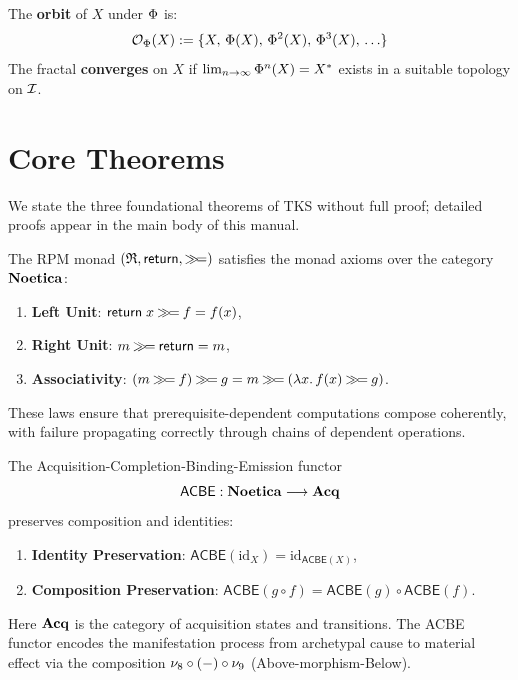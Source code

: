 \begin{definition}
\label{def:fractal-orbit}
The \textbf{orbit} of $X$ under $\Phi$ is:
\[
    \mathcal{O}_\Phi(X) := \{X,\, \Phi(X),\, \Phi^2(X),\, \Phi^3(X),\, \ldots\}
\]
The fractal \textbf{converges} on $X$ if $\lim_{n \to \infty} \Phi^n(X) = X^*$ exists
in a suitable topology on $\mathcal{I}$.
\end{definition}

\section{Core Theorems}
\label{sec:core-theorems}

We state the three foundational theorems of TKS without full proof; detailed proofs
appear in the main body of this manual.

\begin{theorem}
\label{thm:core-rpm}
The RPM monad $(\mathfrak{R}, \mathsf{return}, \mathbin{\gg\!=})$ satisfies the monad axioms over the category
$\mathbf{Noetica}$:
\begin{enumerate}[label=(\alph*)]
    \item \textbf{Left Unit}: $\mathsf{return}\; x \mathbin{\gg\!=} f = f(x)$,
    \item \textbf{Right Unit}: $m \mathbin{\gg\!=} \mathsf{return} = m$,
    \item \textbf{Associativity}: $(m \mathbin{\gg\!=} f) \mathbin{\gg\!=} g = m \mathbin{\gg\!=} (\lambda x.\, f(x) \mathbin{\gg\!=} g)$.
\end{enumerate}
These laws ensure that prerequisite-dependent computations compose coherently, with
failure propagating correctly through chains of dependent operations.
\end{theorem}

\begin{theorem}
\label{thm:core-acbe}
The Acquisition-Completion-Binding-Emission functor
\[
    \mathsf{ACBE} : \mathbf{Noetica} \longrightarrow \mathbf{Acq}
\]
preserves composition and identities:
\begin{enumerate}[label=(\alph*)]
    \item \textbf{Identity Preservation}: $\mathsf{ACBE}(\mathrm{id}_X) = \mathrm{id}_{\mathsf{ACBE}(X)}$,
    \item \textbf{Composition Preservation}: $\mathsf{ACBE}(g \circ f) = \mathsf{ACBE}(g) \circ \mathsf{ACBE}(f)$.
\end{enumerate}
Here $\mathbf{Acq}$ is the category of acquisition states and transitions. The ACBE functor
encodes the manifestation process from archetypal cause to material effect via the
composition $\nu_{8} \circ (-) \circ \nu_{9}$ (Above-morphism-Below).
\end{theorem}

